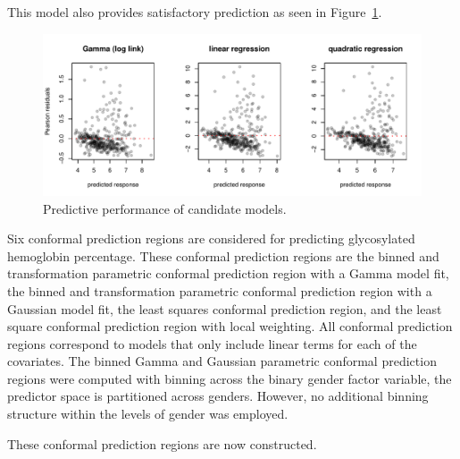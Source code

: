 \documentclass[11pt]{article}\usepackage[]{graphicx}\usepackage[]{color}
\makeatletter
\def\maxwidth{ %
  \ifdim\Gin@nat@width>\linewidth
    \linewidth
  \else
    \Gin@nat@width
  \fi
}
\newenvironment{knitrout}{}{} %
\makeatother
\begin{document}
This model also provides satisfactory prediction as seen in 
Figure~\ref{diabetes:diagnostics}.


\begin{figure}
\begin{center}
\begin{knitrout}
\color{fgcolor}
\includegraphics[width=\maxwidth]{figure/unnamed-chunk-10-1} 

\end{knitrout}
\end{center}
\caption{Predictive performance of candidate models.}
\label{diabetes:diagnostics}
\end{figure}


Six conformal prediction regions are considered for predicting glycosylated 
hemoglobin percentage.  These conformal prediction regions are the binned and 
transformation parametric conformal prediction region with a Gamma model fit, 
the binned and transformation parametric conformal prediction region with a 
Gaussian model fit, the least squares conformal prediction region, 
and the least square conformal prediction region with local weighting.  
All conformal prediction regions correspond to models that only include 
linear terms for each of the covariates.  
The binned Gamma and Gaussian parametric conformal prediction regions were 
computed with binning across the binary gender factor variable, the predictor 
space is partitioned across genders. 
However, no additional binning structure within the levels of gender was 
employed.  


These conformal prediction regions are now constructed.
\end{document}
